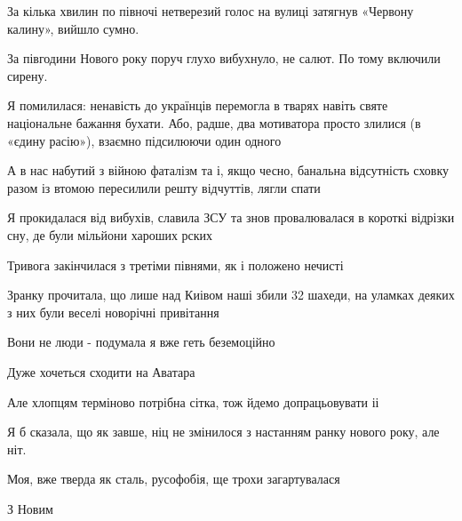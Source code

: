 За кілька хвилин по півночі нетверезий голос на вулиці затягнув «Червону
калину», вийшло сумно.

За півгодини Нового року поруч глухо вибухнуло, не салют.  По тому включили
сирену.

Я помилилася: ненавість до українців перемогла в тварях навіть святе
національне бажання бухати. Або, радше, два мотиватора просто злилися (в «єдину
расію»), взаємно підсилюючи один одного

А в нас набутий з війною фаталізм та і, якщо чесно, банальна відсутність сховку
разом із втомою пересилили решту відчуттів, лягли спати

Я прокидалася від вибухів, славила ЗСУ та знов провалювалася в короткі відрізки
сну, де були мільйони хароших рских

Тривога закінчилася з третіми півнями, як і положено нечисті

Зранку прочитала, що лише над Киівом наші збили 32 шахеди, на уламках деяких з
них були веселі новорічні привітання 

Вони не люди - подумала я вже геть беземоційно

Дуже хочеться сходити на Аватара

Але хлопцям терміново потрібна сітка, тож йдемо допрацьовувати іі

Я б сказала, що як завше, ніц не змінилося з настанням ранку нового року, але
ніт.

Моя, вже тверда як сталь, русофобія, ще трохи загартувалася 

З Новим
